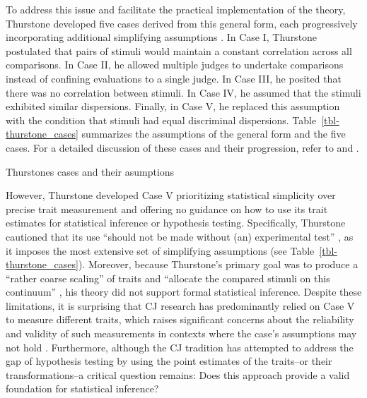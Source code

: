 \documentclass[
  authoryear,
  review,
  1p]{elsarticle}
\begin{document}
To address this issue and facilitate the practical implementation of the
theory, Thurstone developed five cases derived from this general form,
each progressively incorporating additional simplifying assumptions
\citep{Thurstone_1927b}. In Case I, Thurstone postulated that pairs of
stimuli would maintain a constant correlation across all comparisons. In
Case II, he allowed multiple judges to undertake comparisons instead of
confining evaluations to a single judge. In Case III, he posited that
there was no correlation between stimuli. In Case IV, he assumed that
the stimuli exhibited similar dispersions. Finally, in Case V, he
replaced this assumption with the condition that stimuli had equal
discriminal dispersions. Table~\ref{tbl-thurstone_cases} summarizes the
assumptions of the general form and the five cases. For a detailed
discussion of these cases and their progression, refer to
\citet{Thurstone_1927b} and \citet[pp.~248--253]{Bramley_2008}.

\begin{table}

\caption{\label{tbl-thurstone_cases}Thurstones cases and their
asumptions}


\end{table}%

However, Thurstone developed Case V prioritizing statistical simplicity
over precise trait measurement and offering no guidance on how to use
its trait estimates for statistical inference or hypothesis testing.
Specifically, Thurstone cautioned that its use ``should not be made
without (an) experimental test'' \citep[pp.~270]{Thurstone_1927b}, as it
imposes the most extensive set of simplifying assumptions
\citep{Bramley_2008, Kelly_et_al_2022} (see
Table~\ref{tbl-thurstone_cases}). Moreover, because Thurstone's primary
goal was to produce a ``rather coarse scaling'' of traits and ``allocate
the compared stimuli on this continuum''
\citep[pp.~269]{Thurstone_1927b}, his theory did not support formal
statistical inference. Despite these limitations, it is surprising that
CJ research has predominantly relied on Case V to measure different
traits, which raises significant concerns about the reliability and
validity of such measurements in contexts where the case's assumptions
may not hold \citep{Kelly_et_al_2022, Andrich_1978}. Furthermore,
although the CJ tradition has attempted to address the gap of hypothesis
testing by using the point estimates of the traits--or their
transformations--a critical question remains: Does this approach provide
a valid foundation for statistical inference?
\end{document}
